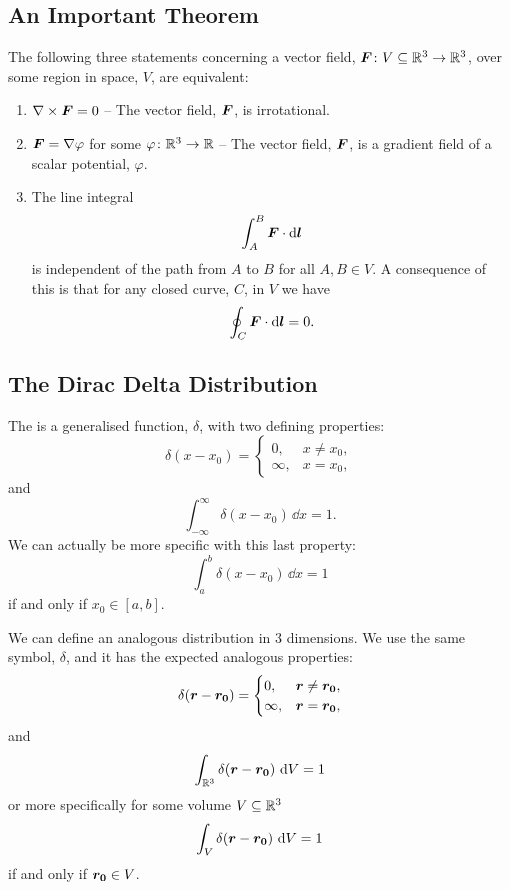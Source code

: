     \subsection{An Important Theorem}\label{sec:an important theorem}
    The following three statements concerning a vector field, \(\bm{F}\colon V\subseteq\mathbb{R}^3\to\mathbb{R}^3\), over some region in space, \(V\), are equivalent:
    \begin{enumerate}
        \item \(\nabla\times\bm{F} = 0\) -- The vector field, \(\bm{F}\), is irrotational.
        \item \(\bm{F} = \nabla\varphi\) for some \(\varphi\colon\mathbb{R}^3\to\mathbb{R}\) -- The vector field, \(\bm{F}\), is a gradient field of a scalar potential, \(\varphi\).
        \item The line integral
        \[\int_A^B \bm{F}\cdot\dd{\bm{l}}\]
        is independent of the path from \(A\) to \(B\) for all \(A, B\in V\).
        A consequence of this is that for any closed curve, \(C\), in \(V\) we have
        \[\oint_C\bm{F}\cdot\dd{\bm{l}} = 0.\]
    \end{enumerate}
    
    \subsection{The Dirac Delta Distribution}\label{sec:Dirac delta distribution}
    The  is a generalised function, \(\delta\), with two defining properties:
    \[
        \delta(x - x_0) = 
        \begin{cases}
            0, & x \ne x_0,\\
            \infty, & x = x_0,
        \end{cases}
    \]
    and
    \[\int_{-\infty}^{\infty} \delta(x - x_0)\,\dd{x} = 1.\]
    We can actually be more specific with this last property:
    \[\int_{a}^{b} \delta(x - x_0)\,\dd{x} = 1\]
    if and only if \(x_0\in [a, b]\).
    
    We can define an analogous distribution in 3 dimensions.
    We use the same symbol, \(\delta\), and it has the expected analogous properties:
    \[
        \delta(\bm{r} - \bm{r_0}) = 
        \begin{cases}
            0, & \bm{r} \ne \bm{r_0},\\
            \infty, & \bm{r} = \bm{r_0},
        \end{cases}
    \]
    and
    \[\int_{\mathbb{R}^3} \delta(\bm{r} - \bm{r_0})\,\dd{V} = 1\]
    or more specifically for some volume \(V\subseteq\mathbb{R}^3\)
    \[\int_V \delta(\bm{r} - \bm{r_0})\,\dd{V} = 1\]
    if and only if \(\bm{r_0}\in V\).
    
